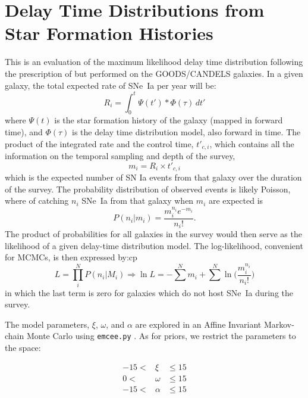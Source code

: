 \documentclass[apj]{aastex}
\begin{document}
\section{Delay Time Distributions from Star Formation Histories}
This is an evaluation of the maximum likelihood delay time distribution following the prescription of \cite{Maoz:2012a} but performed on the GOODS/CANDELS galaxies. In a given galaxy, the total expected rate of SNe~Ia per year will be:
\begin{equation}
R_i = \int_0^t \Psi(t') \ast \Phi(\tau)\,dt'
\end{equation}
\noindent where $\Psi(t)$ is the star formation history of the galaxy (mapped in forward time), and $\Phi(\tau)$ is the delay time distribution model, also forward in time. The product of the integrated rate and the control time, $t'_{c, i}$, which contains all the information on the temporal sampling and depth of the survey, 
\begin{equation}
m_i = R_i \times t'_{c, i}
\end{equation}
\noindent which is the expected number of SN Ia events from that galaxy over the duration of the survey. The probability distribution of observed events is likely Poisson, where of catching $n_i$ SNe~Ia from that galaxy when $m_i$ are expected is
\begin{equation}
P(n_i | m_i) = \frac{m_i^{n_i}e^{-m_i}}{n_i!}.
\end{equation}
The product of probabilities for all galaxies in the survey would then serve as the likelihood of a given delay-time distribution model. The log-likelihood, convenient for MCMCs, is then expressed by:cp 
\begin{equation}
L = \prod _i^N P(n_i|M_i) \Rightarrow \ln L = -\sum^N m_i+\sum^N\ln\biggl(\frac{m_i^{n_i}}{n_i!}\biggr)
\end{equation}
\noindent in which the last term is zero for galaxies which do not host SNe~Ia during the survey.


The model parameters, $\xi$, $\omega$, and $\alpha$ are explored in an Affine Invariant Markov-chain Monte Carlo using {\tt emcee.py} \citep{Foreman-Mackey:2013pd}. As for priors, we restrict the parameters to the space:

\begin{eqnarray*}
-15 <&  \xi &\le 15\\
0 <&\omega &\le 15\\
-15 <&  \alpha &\le 15\\
\end{eqnarray*}
\end{document}
